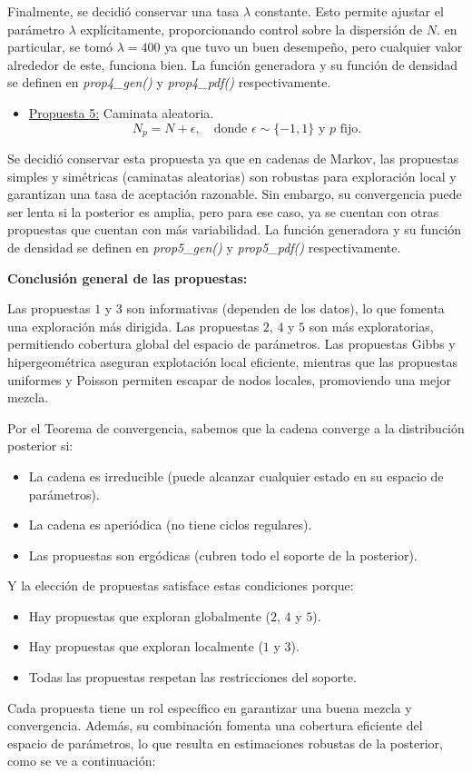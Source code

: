 Finalmente, se decidió conservar una tasa $\lambda$ constante. Esto permite ajustar el parámetro $\lambda$ explícitamente, proporcionando control sobre la dispersión de $N$. en particular, se tomó $\lambda = 400$ ya que tuvo un buen desempeño, pero cualquier valor alrededor de este, funciona bien. La función generadora y su función de densidad se definen en \textit{prop4\_gen()} y \textit{prop4\_pdf()} respectivamente.

\begin{itemize}
	\item \underline{Propuesta 5:} Caminata aleatoria.
	\begin{equation}\label{eq:14}
		N_p = N + \epsilon, \quad \text{donde } \epsilon \sim \{-1, 1\} \text{ y } p \text{ fijo.}
	\end{equation}
\end{itemize}
Se decidió conservar esta propuesta ya que en cadenas de Markov, las propuestas simples y simétricas (caminatas aleatorias) son robustas para exploración local y garantizan una tasa de aceptación razonable. Sin embargo, su convergencia puede ser lenta si la posterior es amplia, pero para ese caso, ya se cuentan con otras propuestas que cuentan con más variabilidad. La función generadora y su función de densidad se definen en \textit{prop5\_gen()} y \textit{prop5\_pdf()} respectivamente.

\textbf{Conclusión general de las propuestas:}

Las propuestas $1$ y $3$ son informativas (dependen de los datos), lo que fomenta una exploración más dirigida. Las propuestas $2$, $4$ y $5$ son más exploratorias, permitiendo cobertura global del espacio de parámetros. Las propuestas Gibbs y hipergeométrica aseguran explotación local eficiente, mientras que las propuestas uniformes y Poisson permiten escapar de nodos locales, promoviendo una mejor mezcla.

Por el Teorema de convergencia, sabemos que la cadena converge a la distribución posterior si:
\begin{itemize}
	\item La cadena es irreducible (puede alcanzar cualquier estado en su espacio de parámetros).
	\item La cadena es aperiódica (no tiene ciclos regulares).
	\item Las propuestas son ergódicas (cubren todo el soporte de la posterior).
\end{itemize}
Y la elección de propuestas satisface estas condiciones porque:
\begin{itemize}
	\item Hay propuestas que exploran globalmente ($2$, $4$ y $5$).
	\item Hay propuestas que exploran localmente ($1$ y $3$).
	\item Todas las propuestas respetan las restricciones del soporte.
\end{itemize}
Cada propuesta tiene un rol específico en garantizar una buena mezcla y convergencia. Además, su combinación fomenta una cobertura eficiente del espacio de parámetros, lo que resulta en estimaciones robustas de la posterior, como se ve a continuación:

